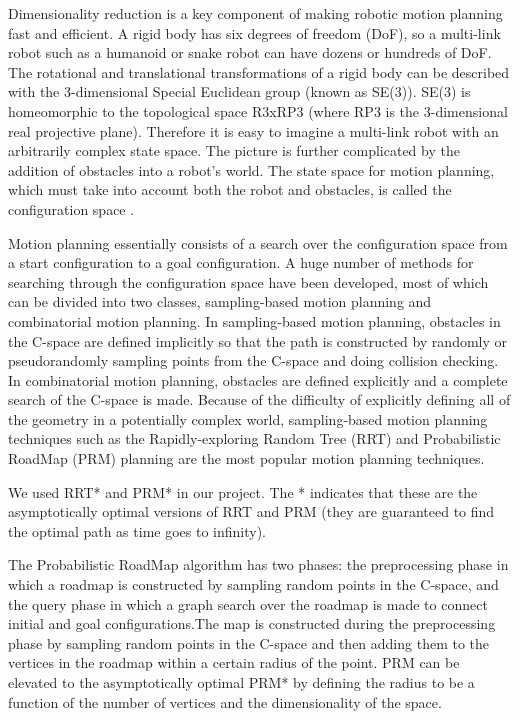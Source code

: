 \documentclass[12pt]{article}
\begin{document}
\maketitle

Dimensionality reduction is a key component of making robotic motion planning
fast and efficient. A rigid body has six degrees of freedom (DoF), so a
multi-link robot such as a humanoid or snake robot can have dozens or hundreds
of DoF. The rotational and translational transformations of a rigid body can be
described with the 3-dimensional Special Euclidean group (known as SE(3)).
SE(3) is homeomorphic to the topological space R3xRP3 (where RP3 is the
3-dimensional real projective plane). Therefore it is easy to imagine a
multi-link robot with an arbitrarily complex state space. The picture is
further complicated by the addition of obstacles into a robot's world. The
state space for motion planning, which must take into account both the robot
and obstacles, is called the configuration space \cite{lavalle2006planning}. 

Motion planning essentially consists of a search over the configuration space
from a start configuration to a goal configuration. A huge number of methods
for searching through the configuration space have been developed, most of
which can be divided into two classes, sampling-based motion planning and
combinatorial motion planning. In sampling-based motion planning, obstacles in
the C-space are defined implicitly so that the path is constructed by randomly
or pseudorandomly sampling points from the C-space and doing collision
checking. In combinatorial motion planning, obstacles are defined explicitly
and a complete search of the C-space is made. Because of the difficulty of
explicitly defining all of the geometry in a potentially complex world,
sampling-based motion planning techniques such as the Rapidly-exploring Random
Tree (RRT) and Probabilistic RoadMap (PRM) planning are the most popular motion
planning techniques.

We used RRT* and PRM* in our project. The * indicates that these are the
asymptotically optimal versions of RRT and PRM (they are guaranteed to find the
optimal path as time goes to infinity).

The Probabilistic RoadMap algorithm has two phases: the preprocessing phase in which a roadmap is constructed by sampling random points in the C-space, and the query phase in which a graph search over the roadmap is made to connect initial and goal configurations.The map is constructed during the preprocessing phase by sampling random points in the C-space and then adding them to the vertices in the roadmap within a certain radius of the point. PRM can be elevated to the asymptotically optimal PRM* by defining the radius to be a function of the number of vertices and the dimensionality of the space.
\end{document}
